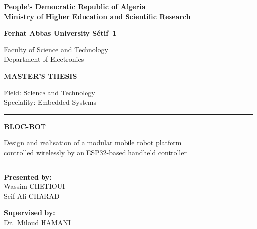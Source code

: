 \begin{titlepage}
  \centering
  \small
  {\bfseries People's Democratic Republic of Algeria\\
  Ministry of Higher Education and Scientific Research\par}
  \vspace{4mm}
  {\large\bfseries Ferhat Abbas University S\'{e}tif~1\par}
  \vspace{1mm}
  Faculty of Science and Technology\\
  Department of Electronics\par
  \vspace{14mm}

  {\large\bfseries MASTER'S THESIS\par}
  \vspace{2mm}
  Field: Science and Technology\\
  Speciality: Embedded Systems\par
  \vspace{12mm}

  \rule{\textwidth}{0.8pt}\par
  \vspace{4mm}
  {\LARGE\bfseries BLOC-BOT\par}
  \vspace{3mm}
  {\Large Design and realisation of a modular mobile robot platform\\
  controlled wirelessly by an ESP32-based handheld controller\par}
  \vspace{4mm}
  \rule{\textwidth}{0.8pt}\par
  \vspace{12mm}

  \begin{minipage}[t]{0.47\textwidth}
    \raggedright
    \textbf{Presented by:}\\[1mm]
    Wassim CHETIOUI\\
    Seif Ali CHARAD
  \end{minipage}\hfill
  \begin{minipage}[t]{0.47\textwidth}
    \raggedleft
    \textbf{Supervised by:}\\[1mm]
    Dr.\ Miloud HAMANI
  \end{minipage}\par
  \vspace{14mm}


\end{titlepage}
